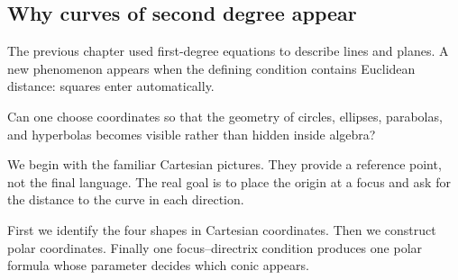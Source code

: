 \subsection{Why curves of second degree appear}

The previous chapter used first-degree equations to describe lines and planes. A
new phenomenon appears when the defining condition contains Euclidean distance:
squares enter automatically.

\begin{corebox}
Can one choose coordinates so that the geometry of circles, ellipses, parabolas,
and hyperbolas becomes visible rather than hidden inside algebra?
\end{corebox}

We begin with the familiar Cartesian pictures. They provide a reference point,
not the final language. The real goal is to place the origin at a focus and ask
for the distance to the curve in each direction.

\begin{center}
\end{center}

\begin{interpretationbox}
First we identify the four shapes in Cartesian coordinates. Then we construct
polar coordinates. Finally one focus--directrix condition produces one polar
formula whose parameter decides which conic appears.
\end{interpretationbox}
